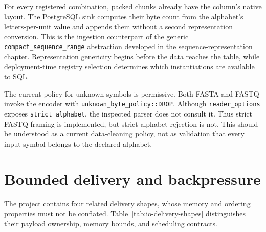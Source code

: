 For every registered combination, packed chunks already have the column's
native layout. The PostgreSQL sink computes their byte count from the
alphabet's letters-per-unit value and appends them without a second
representation conversion. This is the ingestion counterpart of the generic
\texttt{compact\_sequence\_range} abstraction developed in the
sequence-representation chapter. Representation genericity begins before the
data reaches the table, while deployment-time registry selection determines
which instantiations are available to SQL.

The current policy for unknown symbols is permissive.  Both FASTA and FASTQ
invoke the encoder with \texttt{unknown\_byte\_policy::DROP}.  Although
\texttt{reader\_options} exposes \texttt{strict\_alphabet}, the inspected
parser does not consult it.  Thus strict FASTQ framing is implemented, but
strict alphabet rejection is not.  This should be understood as a current
data-cleaning policy, not as validation that every input symbol belongs to the
declared alphabet.

\section{Bounded delivery and backpressure}
\label{sec:io-bounds}

The project contains four related delivery shapes, whose memory and ordering
properties must not be conflated.
Table~\ref{tab:io-delivery-shapes} distinguishes their payload ownership,
memory bounds, and scheduling contracts.

